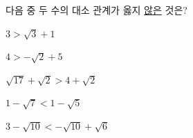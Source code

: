 다음 중 두 수의 대소 관계가 옳지 \underline{않은} 것은?
\begin{choicesv}{\rule[-3ex]{0pt}{8ex}$3>\sqrt{3}+1$}{\rule[-3ex]{0pt}{8ex}$4>-\sqrt{2}+5$}{\rule[-3ex]{0pt}{8ex}$\sqrt{17}+\sqrt{2}>4+\sqrt{2}$}{\rule[-3ex]{0pt}{8ex}$1-\sqrt{7}<1-\sqrt{5}$}{\rule[-3ex]{0pt}{8ex}$3-\sqrt{10}<-\sqrt{10}+\sqrt{6}$}\end{choicesv}
